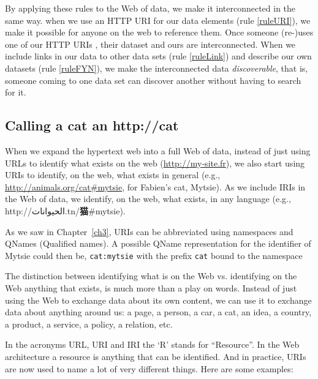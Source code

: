 By applying these  rules to the Web of data, we make it interconnected in the same way.  
when we use an HTTP URI   for our data elements (rule \ref{ruleURI}), 
we make it possible for anyone on the web to reference them. Once someone
(re-)uses one of our HTTP URIs , their dataset and ours
are interconnected.  When we include links in our data to 
other data sets (rule \ref{ruleLink}) and  describe our own 
datasets (rule \ref{ruleFYN}), we make 
the interconnected data \emph{discoverable}, that is, 
someone coming to one data set can discover another
without having to search for it. 


\hypertarget{calling-a-cat-an-httpcat}{%
\subsection{Calling a cat an
http://cat}\label{calling-a-cat-an-httpcat}}

When we expand the hypertext web into a full Web of data, instead of just using URLs to 
identify what exists on the web (\url{http://my-site.fr}), we also start using
URIs to identify, on the web, what exists in general
(e.g., \url{http://animals.org/cat\#mytsie}, for Fabien's cat, Mytsie).  As we include IRIs in the Web of data, we identify,
on the web, what exists, in any language
(e.g., http://الحيوانات.tn/\textbf{猫}\#mytsie).

As we saw in Chapter~\ref{ch3}, URIs can be abbreviated using namespaces and QNames (Qualified names). 
A possible QName representation for the identifier of
Mytsie could then be, \texttt{cat:mytsie} with
the prefix \texttt{cat} bound to the namespace

The distinction between identifying what is on the Web vs. identifying
on the Web anything that exists, is much more than a play on words.
Instead of just using the Web to exchange data about its own content, we
can use it to exchange data about anything around us: a page, a person,
a car, a cat, an idea, a country, a product, a service, a policy, a
relation, etc.

In the acronyms URL, URI and IRI the `R' stands for ``Resource''. In the
Web architecture a resource is anything that can be identified. And in
practice, URIs are now used to name a lot of very different things. Here
are some examples:

